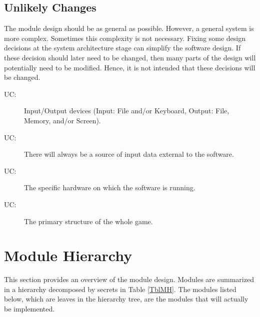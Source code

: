 \documentclass[12pt, titlepage]{article}
\newcounter{ucnum}
\newcommand{\uctheucnum}{UC\theucnum}
\begin{document}
\subsection{Unlikely Changes} \label{SecUchange}

The module design should be as general as possible. However, a general system is
more complex. Sometimes this complexity is not necessary. Fixing some design
decisions at the system architecture stage can simplify the software design. If
these decision should later need to be changed, then many parts of the design
will potentially need to be modified. Hence, it is not intended that these
decisions will be changed.

\begin{description}
\item[ \uctheucnum \label{ucIO}:] Input/Output devices
  (Input: File and/or Keyboard, Output: File, Memory, and/or Screen).
\item[ \uctheucnum \label{ucInput}:] There will always be
  a source of input data external to the software.
\item[ \uctheucnum \label{ucHardware}:] The specific
  hardware on which the software is running.
\item[ \uctheucnum \label{ucStructure}:] The primary structure of the whole game.
\end{description}

\section{Module Hierarchy} \label{SecMH}

This section provides an overview of the module design. Modules are summarized
in a hierarchy decomposed by secrets in Table \ref{TblMH}. The modules listed
below, which are leaves in the hierarchy tree, are the modules that will
actually be implemented.
\end{document}
